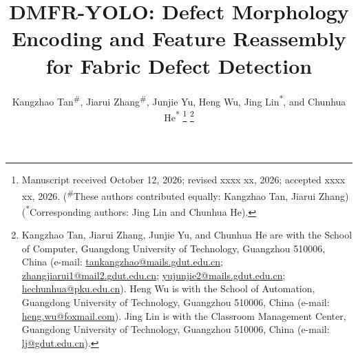 \documentclass[journal]{IEEEtran}
\begin{document}
\raggedbottom

\title{DMFR-YOLO: Defect Morphology Encoding and Feature Reassembly for Fabric Defect Detection}

\author{Kangzhao Tan\textsuperscript{\#}, Jiarui Zhang\textsuperscript{\#}, Junjie Yu, Heng Wu, Jing Lin\textsuperscript{*}, and Chunhua He\textsuperscript{*}%
\thanks{Manuscript received October 12, 2026; revised xxxx xx, 2026; accepted xxxx xx, 2026. (\textsuperscript{\#}These authors contributed equally: Kangzhao Tan, Jiarui Zhang) (\textsuperscript{*}Corresponding authors: Jing Lin and Chunhua He).}%
\thanks{\begingroup{}Kangzhao Tan, Jiarui Zhang, Junjie Yu, and Chunhua He are with the School of Computer, Guangdong University of Technology, Guangzhou 510006, China (e-mail: \protect\url{tankangzhao@mails.gdut.edu.cn}; \protect\url{zhangjiarui1@mail2.gdut.edu.cn}; \protect\url{yujunjie2@mails.gdut.edu.cn}; \protect\url{hechunhua@pku.edu.cn}). Heng Wu is with the School of Automation, Guangdong University of Technology, Guangzhou 510006, China (e-mail: \protect\url{heng.wu@foxmail.com}). Jing Lin is with the Classroom Management Center, Guangdong University of Technology, Guangzhou 510006, China (e-mail: \protect\url{lj@gdut.edu.cn}).\endgroup}%
}

\IEEEaftertitletext{\vspace{-24pt}}
\maketitle
\end{document}
